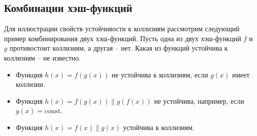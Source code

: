 \subsection{Комбинации хэш-функций}

Для иллюстрации свойств устойчивости к коллизиям рассмотрим следующий пример комбинирования двух хэш-функций. Пусть одна из двух хэш-функций $f$ и $g$ противостоит коллизиям, а другая -- нет. Какая из функций устойчива к коллизиям -- не известно.
\begin{itemize}
    \item Функция $h(x) = f(g(x))$ не устойчива к коллизиям, если $g(x)$ имеет коллизии.
    \item Функция $h(x) = f(g(x)) \| g(f(x))$ не устойчива, например, если $g(x) = \textrm{const}$.
    \item Функция $h(x) = f(x) \| g(x)$ устойчива к коллизиям.
\end{itemize}
